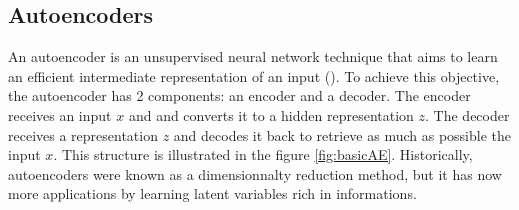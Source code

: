 \documentclass{article}
\begin{document}
\subsection{Autoencoders}

An autoencoder is an unsupervised neural network technique that aims to learn an efficient intermediate representation of an input (\cite{Goodfellow-et-al-2016}). To achieve this objective, the autoencoder has 2 components: an encoder and a decoder. The encoder receives an input $x$ and and converts it to a hidden representation $z$. The decoder receives a representation $z$ and decodes it back to retrieve as much as possible the input $x$. This structure is illustrated in the figure \ref{fig:basicAE}. Historically, autoencoders were known as a dimensionnalty reduction method, but it has now more applications by learning latent variables rich in informations.
\newline
\end{document}
